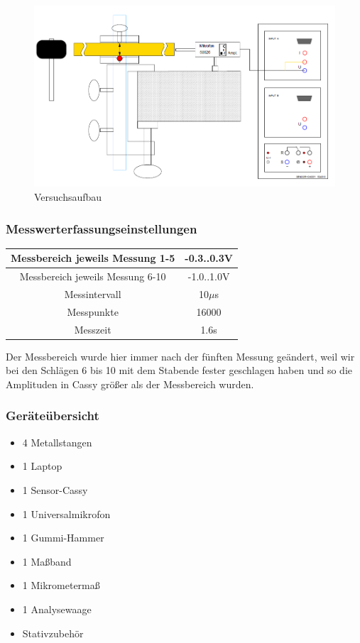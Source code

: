 \documentclass[12pt,a4paper]{article}
\begin{document}
\begin{figure}[H]
\centering
\includegraphics[scale=0.6]{Bilder/Versuchsaufbau_Skript.PNG}
\caption{Versuchsaufbau}
\label{Stange}
\end{figure}


\subsubsection{Messwerterfassungseinstellungen}
\begin{center}
\begin{tabular}{c|c}
Messbereich jeweils Messung 1-5 & -0.3..0.3V\\ 
\hline
Messbereich jeweils Messung 6-10 & -1.0..1.0V\\ 
\hline
Messintervall & 10$\mu$s \\ 
\hline
Messpunkte & 16000 \\ 
\hline
Messzeit & 1.6s \\ 
\end{tabular} 
\end{center}
Der Messbereich wurde hier immer nach der fünften Messung geändert, weil wir bei den Schlägen 6 bis 10 mit dem Stabende fester geschlagen haben und so die Amplituden in Cassy größer als der Messbereich wurden.
\subsubsection{Geräteübersicht}
\begin{itemize}
\item 4 Metallstangen
\item 1 Laptop
\item 1 Sensor-Cassy
\item 1 Universalmikrofon
\item 1 Gummi-Hammer
\item 1 Maßband
\item 1 Mikrometermaß
\item 1 Analysewaage
\item Stativzubehör
\end{itemize}
\newpage
\end{document}
